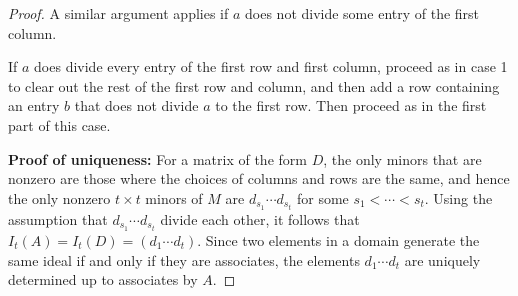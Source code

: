 \documentclass[12pt]{report}
\numberwithin{equation}{section}
\numberwithin{theorem}{chapter}
\theoremstyle{definition}
\newtheorem*{basic properties}{Basic Properties}
\newtheorem*{Important Remark}{Important Remark}
\begin{document}
\begin{proof}
A similar argument applies if $a$ does not divide some entry of the first column.

If $a$ does divide every entry of the first row and first column, proceed as in case 1 to clear out the rest of the first row and column, and then add a row containing an entry $b$ that does not divide $a$ to the first row. Then proceed as in the first part of this case.

\textbf{Proof of uniqueness:} For a matrix of the form $D$, the only minors that are nonzero are those where the choices of columns and rows are the same, and hence the only nonzero $t \times t$ minors of $M$ are $d_{s_1} \cdots d_{s_t}$ for some $s_1 < \cdots < s_t$. Using the assumption that $d_{s_1} \cdots d_{s_t}$ divide each other, it follows that $I_t(A) = I_t(D) = (d_1 \cdots d_t)$.
Since two elements in a domain generate the same ideal if and only if they are associates, the elements $d_1\cdots d_t$ are uniquely determined up to associates by $A$.
\end{proof}
\end{document}
